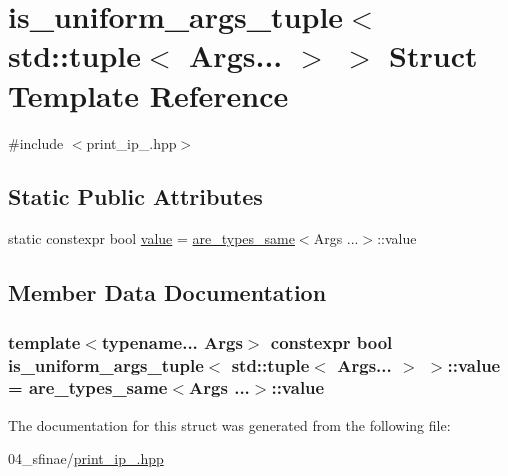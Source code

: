 \hypertarget{structis__uniform__args__tuple_3_01std_1_1tuple_3_01Args_8_8_8_01_4_01_4}{}\section{is\+\_\+uniform\+\_\+args\+\_\+tuple$<$ std\+:\+:tuple$<$ Args... $>$ $>$ Struct Template Reference}
\label{structis__uniform__args__tuple_3_01std_1_1tuple_3_01Args_8_8_8_01_4_01_4}


{\ttfamily \#include $<$print\+\_\+ip\+\_.\+hpp$>$}

\subsection*{Static Public Attributes}
\begin{DoxyCompactItemize}
\item 
static constexpr bool \hyperlink{structis__uniform__args__tuple_3_01std_1_1tuple_3_01Args_8_8_8_01_4_01_4_a99a74b429ae49bfb4894f2710b7dc6f8}{value} = \hyperlink{structare__types__same}{are\+\_\+types\+\_\+same}$<$Args ...$>$\+::value
\end{DoxyCompactItemize}


\subsection{Member Data Documentation}
\subsubsection[{\texorpdfstring{value}{value}}]{\setlength{\rightskip}{0pt plus 5cm}template$<$typename... Args$>$ constexpr bool {\bf is\+\_\+uniform\+\_\+args\+\_\+tuple}$<$ std\+::tuple$<$ Args... $>$ $>$\+::value = {\bf are\+\_\+types\+\_\+same}$<$Args ...$>$\+::value\hspace{0.3cm}{\ttfamily [static]}}\hypertarget{structis__uniform__args__tuple_3_01std_1_1tuple_3_01Args_8_8_8_01_4_01_4_a99a74b429ae49bfb4894f2710b7dc6f8}{}\label{structis__uniform__args__tuple_3_01std_1_1tuple_3_01Args_8_8_8_01_4_01_4_a99a74b429ae49bfb4894f2710b7dc6f8}


The documentation for this struct was generated from the following file\+:\begin{DoxyCompactItemize}
\item 
04\+\_\+sfinae/\hyperlink{print__ip__04_8hpp}{print\+\_\+ip\+\_.\+hpp}\end{DoxyCompactItemize}
